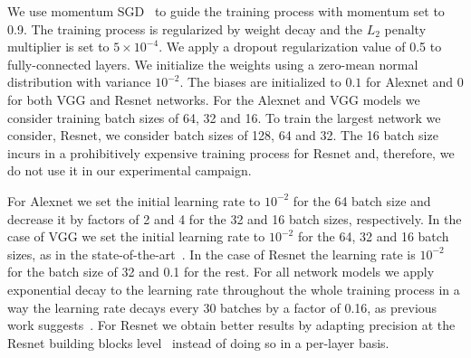 

We use momentum SGD~\cite{momentum} to guide the training process with 
momentum set to 0.9. 
The training process is regularized by weight decay and  the $L_{2}$ 
penalty multiplier is set to $5\times10^{-4}$. 
We apply a dropout 
regularization value of 0.5 to fully-connected layers.
We initialize the weights using a zero-mean normal distribution 
with variance $10^{-2}$. 
The biases are initialized to $0.1$ for Alexnet and $0$ for both VGG and Resnet networks.
For the Alexnet and VGG models we consider training batch sizes of 64, 32 and 16.
To train the largest network we consider, Resnet, we consider batch sizes of 128, 64 and 32.
The 16 batch size incurs in a prohibitively expensive training process for Resnet and, therefore, we do not use it in our experimental campaign. 
%
%

For Alexnet we set the initial learning rate to $10^{-2}$ for the 64 batch size and decrease it by factors of 2 and 4 for the 32 and 16 batch sizes, respectively.
In the case of VGG we 
set the initial learning rate to $10^{-2}$ for the 64, 32 and 16 batch sizes, as in the state-of-the-art~\cite{vgg}.  
In the case of Resnet the learning rate is $10^{-2}$ for the 
batch size of 32 and 0.1 for the rest. 
For all network models we apply exponential decay to the learning rate throughout the whole training process in a way the learning rate decays every 30 batches by a factor of 0.16, as previous work suggests~\cite{alexnet2}.
For Resnet we obtain better results by adapting precision at the Resnet building blocks level~\cite{resnet} instead of doing so in a per-layer basis.

